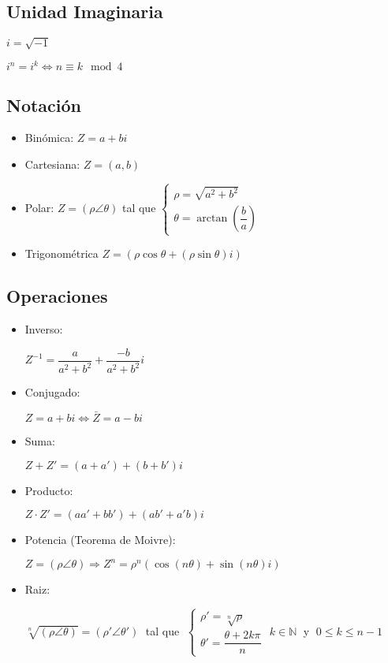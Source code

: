 \documentclass{article}
\begin{document}
\subsection*{Unidad Imaginaria}

$i = \sqrt{-1}$

$i^n = i^k \Longleftrightarrow n \equiv k \mod{4}$

\subsection*{Notación}

\begin{itemize}
    \item Binómica: $Z = a + bi$
    \item Cartesiana: $Z = (a,b)$
    \item Polar: $Z = (\rho\angle\theta)$ tal que $\begin{cases} \rho = \sqrt{a^2+b^2} \\ \theta = \arctan (\dfrac{b}{a})\end{cases}$
    \item Trigonométrica $Z = (\rho\cos\theta + (\rho\sin\theta)i)$
\end{itemize}

\subsection*{Operaciones}

\begin{itemize}
\item Inverso:

\vspace{5pt}
$Z^{-1} = \dfrac{a}{a^2+b^2} + \dfrac{-b}{a^2+b^2} i$

\item Conjugado:

\vspace{5pt}
$Z=a+bi \Longleftrightarrow \bar{Z}=a-bi$

\item Suma:

\vspace{5pt}
$Z + Z' = (a + a') + (b + b')i$

\item Producto:

\vspace{5pt}
$Z \cdot Z' = (aa' + bb') + (ab' + a'b)i$

\item Potencia (Teorema de Moivre):

\vspace{5pt}
$Z = (\rho\angle\theta) \Longrightarrow Z^n = \rho^n (\cos(n\theta)+\sin(n\theta)i)$

\item Raiz:

\vspace{5pt}
$\sqrt[n]{(\rho\angle\theta)} = (\rho'\angle\theta') \;$ tal que $\; \begin{cases} \rho' = \sqrt[n]{\rho} \\ \theta' = \dfrac{\theta + 2k\pi}{n}\end{cases}$ $k \in \mathbb{N} \;$ y $\; 0 \leq k \leq n - 1$
\end{itemize}
\end{document}
